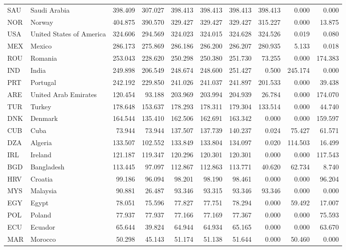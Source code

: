 \begin{table}[ht]
\begin{tabular}{llrrrrrrrr}
  SAU & Saudi Arabia & 398.409 & 307.027 & 398.413 & 398.413 & 398.413 & 398.413 & 0.000 & 0.000 \\ 
  NOR & Norway & 404.875 & 390.570 & 329.427 & 329.427 & 329.427 & 315.227 & 0.000 & 13.875 \\ 
  USA & United States of America & 324.606 & 294.569 & 324.023 & 324.015 & 324.628 & 324.526 & 0.019 & 0.080 \\ 
  MEX & Mexico & 286.173 & 275.869 & 286.186 & 286.200 & 286.207 & 280.935 & 5.133 & 0.018 \\ 
  ROU & Romania & 253.043 & 228.620 & 250.298 & 250.380 & 251.730 & 73.255 & 0.000 & 174.383 \\ 
  IND & India & 249.898 & 206.549 & 248.674 & 248.600 & 251.427 & 0.500 & 245.174 & 0.000 \\ 
  PRT & Portugal & 242.192 & 229.850 & 241.026 & 241.037 & 241.897 & 201.533 & 0.000 & 39.438 \\ 
  ARE & United Arab Emirates & 120.454 & 93.188 & 203.969 & 203.994 & 204.939 & 26.784 & 0.000 & 174.070 \\ 
  TUR & Turkey & 178.648 & 153.637 & 178.293 & 178.311 & 179.304 & 133.514 & 0.000 & 44.740 \\ 
  DNK & Denmark & 164.544 & 135.410 & 162.506 & 162.691 & 163.342 & 0.000 & 0.000 & 159.597 \\ 
  CUB & Cuba & 73.944 & 73.944 & 137.507 & 137.739 & 140.237 & 0.024 & 75.427 & 61.571 \\ 
  DZA & Algeria & 133.507 & 102.552 & 133.849 & 133.804 & 134.097 & 0.020 & 114.503 & 16.499 \\ 
  IRL & Ireland & 121.187 & 119.347 & 120.296 & 120.301 & 120.301 & 0.000 & 0.000 & 117.543 \\ 
  BGD & Bangladesh & 113.445 & 97.097 & 112.867 & 112.863 & 113.771 & 40.620 & 62.734 & 8.740 \\ 
  HRV & Croatia & 99.186 & 96.094 & 98.201 & 98.190 & 98.461 & 0.000 & 0.000 & 96.204 \\ 
  MYS & Malaysia & 90.881 & 26.487 & 93.346 & 93.315 & 93.346 & 93.346 & 0.000 & 0.000 \\ 
  EGY & Egypt & 78.051 & 75.596 & 77.827 & 77.751 & 78.294 & 0.000 & 59.492 & 17.007 \\ 
  POL & Poland & 77.937 & 77.937 & 77.166 & 77.169 & 77.367 & 0.000 & 0.000 & 75.593 \\ 
  ECU & Ecuador & 65.644 & 39.824 & 64.944 & 64.934 & 65.165 & 0.000 & 0.000 & 63.670 \\ 
  MAR & Morocco & 50.298 & 45.143 & 51.174 & 51.138 & 51.644 & 0.000 & 50.460 & 0.000 \\ 

\end{tabular}
\end{table}
